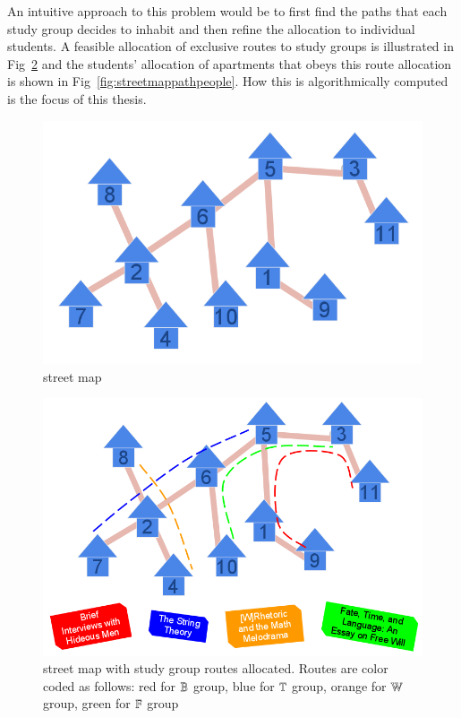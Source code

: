 \documentclass[MS,synopsis]{iitmdiss}
\begin{document}
An intuitive approach to this problem would be to first find the paths
that each study group decides to inhabit and then refine the
allocation to individual students. A feasible allocation of exclusive
routes to study groups is illustrated in Fig~\ref{fig:streetmappath}
and the students' allocation of apartments that obeys this route
allocation is shown in Fig~\ref{fig:streetmappathpeople}. How this is
algorithmically computed is the focus of this thesis.

\begin{figure}[htbp]
 \centering
  \includegraphics[scale=0.3]{../img/1_infinite_loop.png}
  \caption{{\residenceblock} street map}
  \label{fig:streetmap}
\end{figure}

\begin{figure}[htbp]
  \centering
  \includegraphics[scale=0.3]{../img/2_infinite_loop_BTWF.png}
  \caption{{\residenceblock} street map with study group routes
    allocated. Routes are color coded as follows: red for
    \textcolor{red}{$\mathbb{B}$} group, blue for \textcolor{blue}{$\mathbb{T}$}
    group, orange for \textcolor{YellowOrange}{$\mathbb{W}$} group, green for
    \textcolor{green}{$\mathbb{F}$} group}
  \label{fig:streetmappath}
\end{figure}
\end{document}

